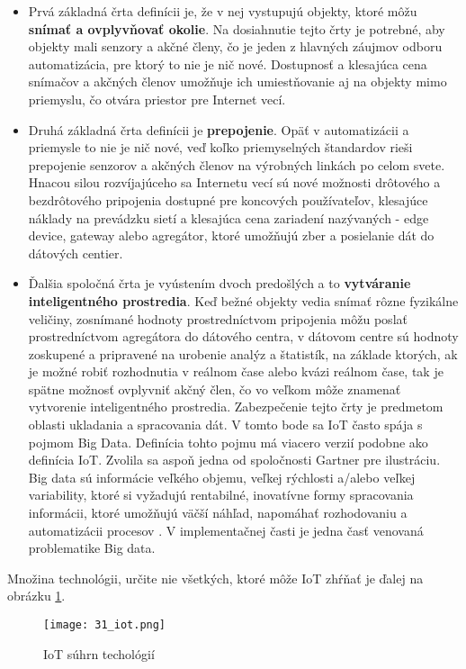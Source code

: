 \begin{itemize}
 \item Prvá základná črta definícii je, že v nej vystupujú objekty, ktoré môžu \textbf{snímať a ovplyvňovať okolie}. Na dosiahnutie tejto črty je potrebné, aby objekty mali senzory a akčné členy, čo je jeden z hlavných záujmov odboru automatizácia, pre ktorý to nie je nič nové. Dostupnosť a klesajúca cena snímačov a akčných členov umožňuje ich umiestňovanie aj na objekty mimo priemyslu, čo otvára priestor pre Internet vecí. 
 \item Druhá základná črta definícii je \textbf{prepojenie}. Opäť v automatizácii a priemysle to nie je nič nové, veď koľko priemyselných štandardov rieši prepojenie senzorov a akčných členov na výrobných linkách po celom svete. Hnacou silou rozvíjajúceho sa Internetu vecí sú nové možnosti drôtového a bezdrôtového pripojenia dostupné pre koncových používateľov, klesajúce náklady na prevádzku sietí a klesajúca cena zariadení nazývaných - edge device, gateway alebo agregátor, ktoré umožňujú zber a posielanie dát do dátových centier.
 \item Ďalšia spoločná črta je vyústením dvoch predošlých a to \textbf{vytváranie inteligentného prostredia}. Keď bežné objekty vedia snímať rôzne fyzikálne veličiny, zosnímané hodnoty prostredníctvom pripojenia  môžu poslať prostredníctvom agregátora do dátového centra, v dátovom centre sú hodnoty zoskupené a pripravené na urobenie analýz a štatistík, na základe ktorých, ak je možné robiť rozhodnutia v reálnom čase alebo kvázi reálnom čase, tak je spätne možnosť ovplyvniť akčný člen, čo vo veľkom môže znamenať vytvorenie inteligentného prostredia. Zabezpečenie tejto črty je predmetom oblasti ukladania a spracovania dát. V tomto bode sa IoT často spája s pojmom Big Data. Definícia tohto pojmu má viacero verzií podobne ako definícia IoT. Zvolila sa aspoň jedna od spoločnosti Gartner pre ilustráciu. Big data sú informácie veľkého objemu, veľkej rýchlosti a/alebo veľkej variability, ktoré si vyžadujú rentabilné, inovatívne formy spracovania informácii, ktoré umožňujú väčší náhľad, napomáhať rozhodovaniu a automatizácii procesov \cite{IOT19}. V implementačnej časti je jedna časť venovaná problematike Big data.
\end{itemize}
Množina technológii, určite nie všetkých, ktoré môže IoT zhŕňať je ďalej na obrázku \ref{31_iot}.
\begin{figure}[!htbp]
\centering
\texttt{[image: 31\_iot.png]}
\caption{IoT súhrn techológií \cite{IOT20}}
\label{31_iot}
\end{figure} 
